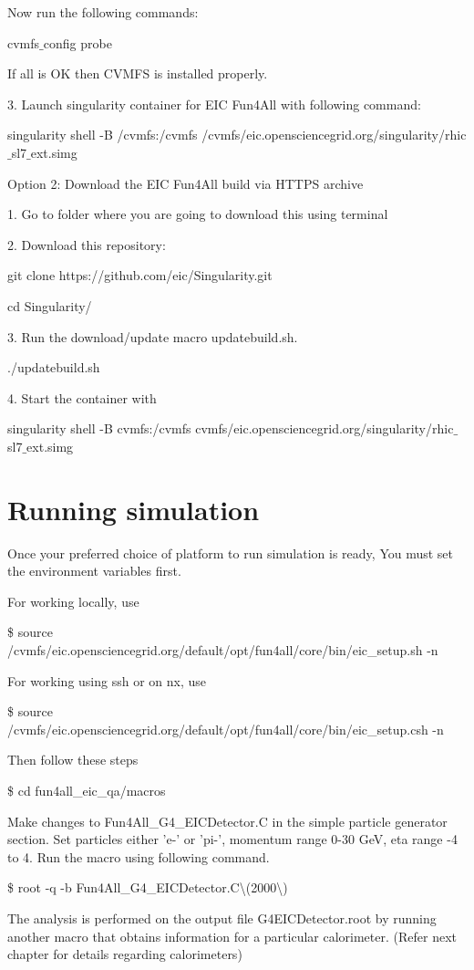 Now run the following commands:

cvmfs$\_$config probe

If all is OK then CVMFS is installed properly.

3. Launch singularity container for EIC Fun4All with following command:

singularity shell -B /cvmfs:/cvmfs /cvmfs/eic.opensciencegrid.org/singularity/rhic$\_$sl7$\_$ext.simg

Option 2: Download the EIC Fun4All build via HTTPS archive

1. Go to folder where you are going to download this using terminal

2. Download this repository:

git clone https://github.com/eic/Singularity.git

cd Singularity/

3. Run the download/update macro updatebuild.sh.

./updatebuild.sh

4. Start the container with

singularity shell -B cvmfs:/cvmfs cvmfs/eic.opensciencegrid.org/singularity/rhic$\_$sl7$\_$ext.simg

\section{Running simulation}
Once your preferred choice of platform to run simulation is ready, You must set the environment variables first. 

For working locally, use 

\$ source /cvmfs/eic.opensciencegrid.org/default/opt/fun4all/core/bin/eic\_setup.sh -n

For working using ssh or on nx, use

\$ source /cvmfs/eic.opensciencegrid.org/default/opt/fun4all/core/bin/eic\_setup.csh -n

Then follow these steps

\$ cd fun4all\_eic\_qa/macros

Make changes to Fun4All\_G4\_EICDetector.C in the simple particle generator section. Set particles either 'e-' or 'pi-', momentum range 0-30 GeV, eta range -4 to 4. Run the macro using following command.

\$ root -q -b Fun4All\_G4\_EICDetector.C\textbackslash(2000\textbackslash)

The analysis is performed on the output file G4EICDetector.root by running another macro that obtains information for a particular calorimeter. (Refer next chapter for details regarding calorimeters)

